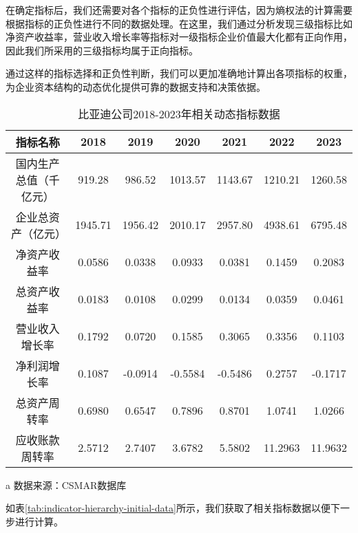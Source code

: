 在确定指标后，我们还需要对各个指标的正负性进行评估，因为熵权法的计算需要根据指标的正负性进行不同的数据处理。在这里，我们通过分析发现三级指标比如净资产收益率，营业收入增长率等指标对一级指标企业价值最大化都有正向作用，因此我们所采用的三级指标均属于正向指标。

通过这样的指标选择和正负性判断，我们可以更加准确地计算出各项指标的权重，为企业资本结构的动态优化提供可靠的数据支持和决策依据。

\begin{table}
  \centering
  \begin{threeparttable}[c]
    \caption{比亚迪公司2018-2023年相关动态指标数据}
    \label{tab:indicator-hierarchy-initial-data}
    \begin{tabular}{ccccccc}
      \toprule
        指标名称 & 2018 & 2019 & 2020 & 2021 & 2022 & 2023 \\ 
      \midrule
        国内生产总值（千亿元） & 919.28  & 986.52  & 1013.57  & 1143.67  & 1210.21  & 1260.58  \\ 
        企业总资产（亿元） & 1945.71  & 1956.42  & 2010.17  & 2957.80  & 4938.61  & 6795.48  \\ 
        净资产收益率 & 0.0586  & 0.0338  & 0.0933  & 0.0381  & 0.1459  & 0.2083  \\ 
        总资产收益率 & 0.0183  & 0.0108  & 0.0299  & 0.0134  & 0.0359  & 0.0461  \\ 
        营业收入增长率 & 0.1792  & 0.0720  & 0.1585  & 0.3065  & 0.3356  & 0.1103  \\ 
        净利润增长率 & 0.1087  & -0.0914  & -0.5584  & -0.5486  & 0.2757  & -0.1717  \\ 
        总资产周转率 & 0.6980  & 0.6547  & 0.7896  & 0.8701  & 1.0741  & 1.0266  \\ 
        应收账款周转率 & 2.5712  & 2.7407  & 3.6782  & 5.5802  & 11.2963  & 11.9632 \\ 
      \bottomrule
    \end{tabular}
    \begin{tablenotes}
      \item [a] 数据来源：CSMAR数据库
    \end{tablenotes}
  \end{threeparttable}
\end{table}
如表\eqref{tab:indicator-hierarchy-initial-data}所示，我们获取了相关指标数据以便下一步进行计算。

